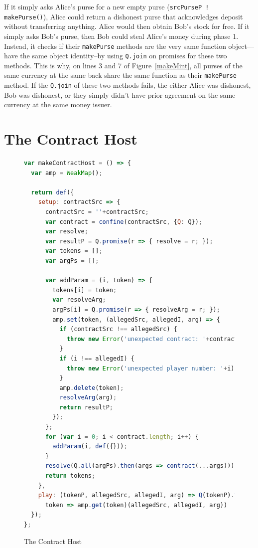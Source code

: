 \documentclass{llncs}
\begin{document}
If it simply asks Alice's purse for a new empty purse ({\tt srcPurseP ! makePurse()}), Alice could return a dishonest purse that acknowledges deposit without transferring anything. Alice would then obtain Bob's stock for free. If it simply asks Bob's purse, then Bob could steal Alice's money during phase 1. Instead, it checks if their {\tt makePurse} methods are the very same function object---have the same object identity--by using {\tt Q.join} on promises for these two methods. This is why, on lines 3 and 7 of Figure~\ref{makeMint}, all purses of the same currency at the same back share the same function as their {\tt makePurse} method. If the {\tt Q.join} of these two methods fails, the either Alice was dishonest, Bob was dishonest, or they simply didn't have prior agreement on the same currency at the same money issuer.



\section{The Contract Host}

\begin{figure}[htbp]
\begin{lstlisting}[language=javascript]
var makeContractHost = () => {
  var amp = WeakMap();

  return def({
    setup: contractSrc => {
      contractSrc = ''+contractSrc;
      var contract = confine(contractSrc, {Q: Q});
      var resolve;
      var resultP = Q.promise(r => { resolve = r; });
      var tokens = [];
      var argPs = [];

      var addParam = (i, token) => {
        tokens[i] = token;
        var resolveArg;
        argPs[i] = Q.promise(r => { resolveArg = r; });
        amp.set(token, (allegedSrc, allegedI, arg) => {
          if (contractSrc !== allegedSrc) {
            throw new Error('unexpected contract: '+contractSrc);
          }
          if (i !== allegedI) {
            throw new Error('unexpected player number: '+i);
          }
          amp.delete(token);
          resolveArg(arg);
          return resultP;
        });
      };
      for (var i = 0; i < contract.length; i++) {
        addParam(i, def({}));
      }
      resolve(Q.all(argPs).then(args => contract(...args)));
      return tokens;
    },
    play: (tokenP, allegedSrc, allegedI, arg) => Q(tokenP).then(
      token => amp.get(token)(allegedSrc, allegedI, arg))
  });
};
\end{lstlisting}
\caption{The Contract Host}
\label{makeContractHost}
\end{figure}
\end{document}
